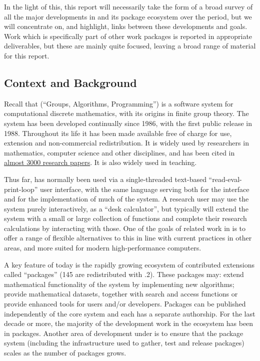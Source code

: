 \documentclass{deliverablereport}
\begin{document}
In the light of this, this report will necessarily take the form of  a broad
survey of all the major developments in \GAP and its package ecosystem
over the period, but we will concentrate on, and highlight, links between
these developments and \ODK goals. Work which is specifically part of
other work packages is reported in appropriate deliverables, but these
are mainly quite focused, leaving a broad range of material for this report.

\subsection{Context and Background}

Recall that \GAP (``Groups, Algorithms, Programming'') is a software system for
computational discrete mathematics, with its origins in finite group
theory. The system has been developed continually since 1986, with the
first public release in 1988. Throughout its life it has been made
available free of charge for use, extension and non-commercial
redistribution. It is widely used by researchers in mathematics,
computer science and other disciplines, and has been cited in
\href{https://www.gap-system.org/Doc/Bib/bib.html}{almost 3000
  research papers}. It is also widely used in teaching.


Thus far, \GAP has
normally been used via a single-threaded text-based ``read-eval-print-loop'' user interface, with the
same \GAP language serving both for the interface and for the
implementation of much of the system. A research user 
may use the system purely interactively, as a ``desk calculator'', but
typically will extend the system with a small or large collection of
\GAP functions and complete their research calculations by interacting
with those. One of the goals of \GAP related work in \ODK is to offer
a range of flexible alternatives to this in line with current
practices in other areas, and more suited for modern high-performance
computers.

A key feature of \GAP today is the rapidly growing ecosystem of
contributed extensions called ``packages'' (145 are redistributed with
.2). These packages may: extend mathematical functionality of
the system by implementing new algorithms; provide mathematical
datasets, together with search and access functions or provide
enhanced tools for users and/or developers. Packages can be published
independently of the core \GAP system and each has a separate
authorship. For the last decade or more, the majority of the
development work in the \GAP ecosystem has been in packages.
Another area of \GAP development under \ODK is to ensure
that the package system (including the infrastructure used to gather,
test and release packages) scales as the number of packages grows.
\end{document}
